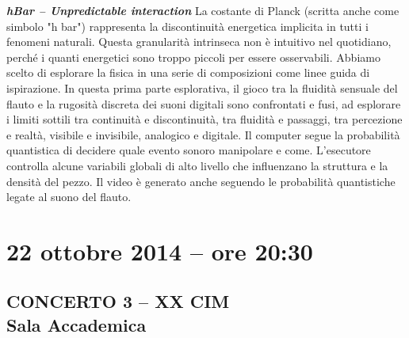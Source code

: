 \documentclass[9pt, twoside, a5paper]{extreport}
\newcommand{\descrizione}[2]{%
\noindent \textbf{\textit{#1}} %
#2 %
\\
}%
\begin{document}
\begin{multicols}{2}
\descrizione{hBar -- Unpredictable interaction}{La costante di Planck (scritta anche come simbolo "h bar") rappresenta la discontinuità energetica implicita in tutti i fenomeni naturali. Questa granularità intrinseca non è intuitivo nel quotidiano, perché i quanti energetici sono troppo piccoli per essere osservabili. Abbiamo scelto di esplorare la fisica in una serie di composizioni come linee guida di ispirazione. In questa prima parte esplorativa, il gioco tra la fluidità sensuale del flauto e la rugosità discreta dei suoni digitali sono confrontati e fusi, ad esplorare i limiti sottili tra continuità e discontinuità, tra fluidità e passaggi, tra percezione e realtà, visibile e invisibile, analogico e digitale. Il computer segue la probabilità quantistica di decidere quale evento sonoro manipolare e come. L'esecutore controlla alcune variabili globali di alto livello che influenzano la struttura e la densità del pezzo. Il video è generato anche seguendo le probabilità quantistiche legate al suono del flauto.}


\end{multicols}

\clearpage



\section*{22 ottobre 2014 -- ore 20:30}
\subsection*{{\small CONCERTO 3 -- XX CIM\\}\textsf{Sala Accademica\\}}
\end{document}
